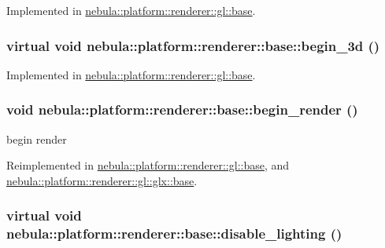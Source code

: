 Implemented in \hyperlink{classnebula_1_1platform_1_1renderer_1_1gl_1_1base_aa41ad5ca7c94ba066c7e9ee99574d4ef}{nebula::platform::renderer::gl::base}.\hypertarget{classnebula_1_1platform_1_1renderer_1_1base_a2028e1c00c65bec5ded87373048d939d}{
\subsubsection[{begin\_\-3d}]{\setlength{\rightskip}{0pt plus 5cm}virtual void nebula::platform::renderer::base::begin\_\-3d ()}}
\label{classnebula_1_1platform_1_1renderer_1_1base_a2028e1c00c65bec5ded87373048d939d}


Implemented in \hyperlink{classnebula_1_1platform_1_1renderer_1_1gl_1_1base_aade6306589ca7fea773433e8f2ac2e52}{nebula::platform::renderer::gl::base}.\hypertarget{classnebula_1_1platform_1_1renderer_1_1base_a125a4fd0dfc31be859c37067eaada43d}{
\subsubsection[{begin\_\-render}]{\setlength{\rightskip}{0pt plus 5cm}void nebula::platform::renderer::base::begin\_\-render ()}}
\label{classnebula_1_1platform_1_1renderer_1_1base_a125a4fd0dfc31be859c37067eaada43d}


begin render 

Reimplemented in \hyperlink{classnebula_1_1platform_1_1renderer_1_1gl_1_1base_a992eba193eb6f08eea3f22363ff5ee18}{nebula::platform::renderer::gl::base}, and \hyperlink{classnebula_1_1platform_1_1renderer_1_1gl_1_1glx_1_1base_abfc5fa20a21e5278d6a49103f017c8e6}{nebula::platform::renderer::gl::glx::base}.\hypertarget{classnebula_1_1platform_1_1renderer_1_1base_a31113fc53b2a1c65645f7534a8f6bfcc}{
\subsubsection[{disable\_\-lighting}]{\setlength{\rightskip}{0pt plus 5cm}virtual void nebula::platform::renderer::base::disable\_\-lighting ()}}
\label{classnebula_1_1platform_1_1renderer_1_1base_a31113fc53b2a1c65645f7534a8f6bfcc}


